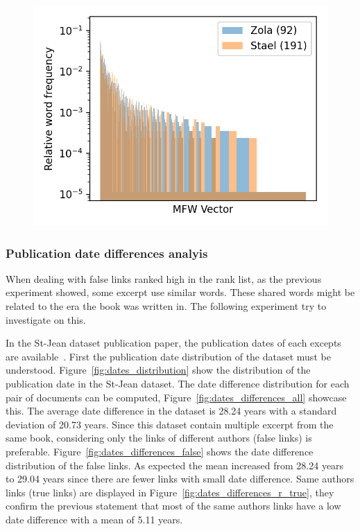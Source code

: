 \begin{figure}
  \label{fig:mfw_vector_last_rl}
  \includegraphics[width=\linewidth]{img/mfw_vector_last_rl.png}
\end{figure}

\subsubsection{Publication date differences analyis}

When dealing with false links ranked high in the rank list, as the previous experiment showed, some excerpt use similar words.
These shared words might be related to the era the book was written in.
The following experiment try to investigate on this.

In the St-Jean dataset publication paper, the publication dates of each excepts are available~\cite{st_jean}.
First the publication date distribution of the dataset must be understood.
Figure~\ref{fig:dates_distribution} show the distribution of the publication date in the St-Jean dataset.
The date difference distribution for each pair of documents can be computed, Figure~\ref{fig:dates_differences_all} showcase this.
The average date difference in the dataset is 28.24 years with a standard deviation of 20.73 years.
Since this dataset contain multiple excerpt from the same book, considering only the links of different authors (false links) is preferable.
Figure~\ref{fig:dates_differences_false} shows the date difference distribution of the false links.
As expected the mean increased from 28.24 years to 29.04 years since there are fewer links with small date difference.
Same authors links (true links) are displayed in Figure~\ref{fig:dates_differences_r_true}, they confirm the previous statement that most of the same authors links have a low date difference with a mean of 5.11 years.

